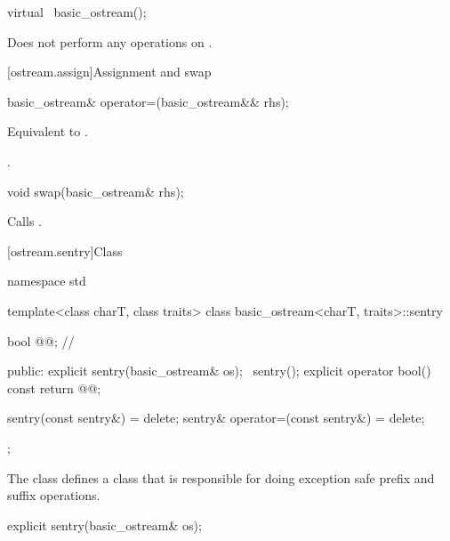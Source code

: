 %
\begin{itemdecl}
virtual ~basic_ostream();
\end{itemdecl}

\begin{itemdescr}
\pnum
\remarks
Does not perform any operations on
.
\end{itemdescr}

[ostream.assign]{Assignment and swap}

%
\begin{itemdecl}
basic_ostream& operator=(basic_ostream&& rhs);
\end{itemdecl}

\begin{itemdescr}
\pnum
\effects
Equivalent to .

\pnum
\returns
{}.
\end{itemdescr}

%
\begin{itemdecl}
void swap(basic_ostream& rhs);
\end{itemdecl}

\begin{itemdescr}
\pnum
\effects
Calls .
\end{itemdescr}

[ostream.sentry]{Class }

%
%
\begin{codeblock}
namespace std {
  template<class charT, class traits>
  class basic_ostream<charT, traits>::sentry {
    bool @@;       // \expos

  public:
    explicit sentry(basic_ostream& os);
    ~sentry();
    explicit operator bool() const { return @@; }

    sentry(const sentry&) = delete;
    sentry& operator=(const sentry&) = delete;
  };
}
\end{codeblock}

\pnum
The class
defines a class that is responsible for doing exception safe prefix and suffix
operations.

%
\begin{itemdecl}
explicit sentry(basic_ostream& os);
\end{itemdecl}


